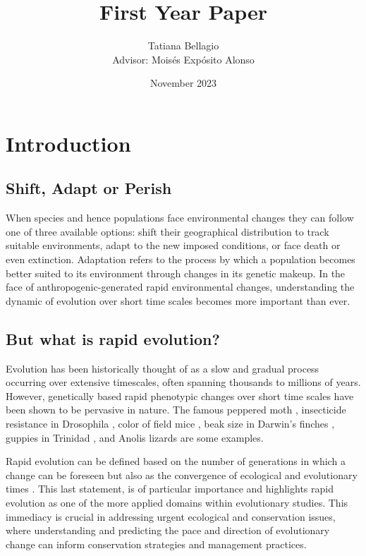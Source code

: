 \documentclass{article}
\title{First Year Paper} %
\author{Tatiana Bellagio \\ Advisor: Moisés Expósito Alonso}
\date{November 2023}
\begin{document}
\maketitle

\tableofcontents
\newpage %

\section{Introduction}
\subsection{Shift, Adapt or Perish}
When species and hence populations face environmental changes they can follow one of three available options: shift their geographical distribution to track suitable environments, adapt to the new imposed conditions, or face death or even extinction. Adaptation refers to the process by which a population becomes better suited to its environment through changes in its genetic makeup. In the face of anthropogenic-generated rapid environmental changes, understanding the dynamic of evolution over short time scales becomes more important than ever. 

\subsection{But what is rapid evolution?}
Evolution has been historically thought of as a slow and gradual process occurring over extensive timescales, often spanning thousands to millions of years. However, genetically based rapid phenotypic changes over short time scales have been shown to be pervasive in nature. The famous peppered moth \citep{Cook2013-bs}, insecticide resistance in Drosophila \citep{Daborn2002-is}, color of field mice \citep{Vignieri2010-if}, beak size in Darwin’s finches \citep{Grant2008-uc}, guppies in Trinidad \citep{Kemp2009-ji}, and Anolis lizards \citep{Losos2009-vq} are some examples.

Rapid evolution can be defined based on the number of generations in which a change can be foreseen but also as the convergence of ecological and evolutionary times \citep{Hairston2005-qo}. This last statement, is of particular importance and highlights rapid evolution as one of the more applied domains within evolutionary studies. This immediacy is crucial in addressing urgent ecological and conservation issues, where understanding and predicting the pace and direction of evolutionary change can inform conservation strategies and management practices. 
\end{document}
